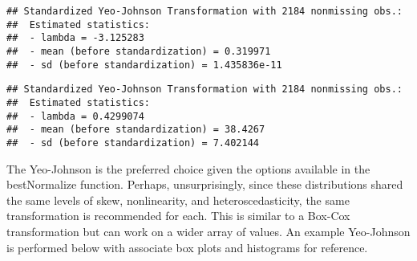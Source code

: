 \documentclass[
]{article}
\newenvironment{Shaded}{\begin{snugshade}}{\end{snugshade}}
\newcommand{\AttributeTok}[1]{\textcolor[rgb]{0.77,0.63,0.00}{#1}}
\newcommand{\CommentTok}[1]{\textcolor[rgb]{0.56,0.35,0.01}{\textit{#1}}}
\newcommand{\ConstantTok}[1]{\textcolor[rgb]{0.00,0.00,0.00}{#1}}
\newcommand{\DecValTok}[1]{\textcolor[rgb]{0.00,0.00,0.81}{#1}}
\newcommand{\FloatTok}[1]{\textcolor[rgb]{0.00,0.00,0.81}{#1}}
\newcommand{\FunctionTok}[1]{\textcolor[rgb]{0.00,0.00,0.00}{#1}}
\newcommand{\NormalTok}[1]{#1}
\newcommand{\OtherTok}[1]{\textcolor[rgb]{0.56,0.35,0.01}{#1}}
\newcommand{\SpecialCharTok}[1]{\textcolor[rgb]{0.00,0.00,0.00}{#1}}
\newcommand{\StringTok}[1]{\textcolor[rgb]{0.31,0.60,0.02}{#1}}
\begin{document}
\begin{Shaded}
\end{Shaded}

\begin{verbatim}
## Standardized Yeo-Johnson Transformation with 2184 nonmissing obs.:
##  Estimated statistics:
##  - lambda = -3.125283 
##  - mean (before standardization) = 0.319971 
##  - sd (before standardization) = 1.435836e-11
\end{verbatim}

\begin{Shaded}
\end{Shaded}

\begin{verbatim}
## Standardized Yeo-Johnson Transformation with 2184 nonmissing obs.:
##  Estimated statistics:
##  - lambda = 0.4299074 
##  - mean (before standardization) = 38.4267 
##  - sd (before standardization) = 7.402144
\end{verbatim}

The Yeo-Johnson is the preferred choice given the options available in
the bestNormalize function. Perhaps, unsurprisingly, since these
distributions shared the same levels of skew, nonlinearity, and
heteroscedasticity, the same transformation is recommended for each.
This is similar to a Box-Cox transformation but can work on a wider
array of values. An example Yeo-Johnson is performed below with
associate box plots and histograms for reference.

\begin{Shaded}
\end{Shaded}
\end{document}
